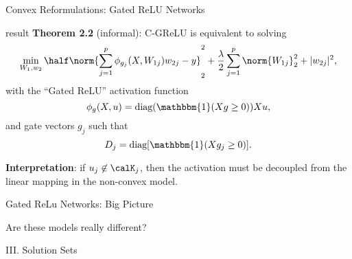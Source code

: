 \documentclass[usenames,dvipsnames,mathserif,notheorems]{beamer}
\begin{document}
\begin{frame}{Convex Reformulations: Gated ReLU Networks}

	\begin{beamercolorbox}[wd=\textwidth,sep=1em]{result}
		\textbf{Theorem 2.2} (informal): C-GReLU is equivalent to solving
		\[
			\min_{W_1, w_2} \half \norm{\sum_{j=1}^p \phi_{g_j}(X, W_{1j})w_{2j} - y}_2^2 + \frac{\lambda}{2} \sum_{j=1}^p \norm{W_{1j}}_2^2 + |w_{2j}|^2,
		\]
		with the ``Gated ReLU'' \citep{fiat2019decoupling} activation function
		\[ \phi_{g}(X, u) = \text{diag}(\mathbbm{1}(Xg \geq 0)) X u, \]
		and gate vectors \( g_j \) such that
		\[
			D_j = \text{diag}[\mathbbm{1}(X g_j \geq 0)].
		\]
	\end{beamercolorbox}
	\pause

	\textbf{Interpretation}: if \( u_j \not \in \calK_j \), then the activation
	must be decoupled from the linear mapping in the non-convex model.

\end{frame}



\begin{frame}{Gated ReLu Networks: Big Picture}
	\begin{center}
		\Large Are these models really different?
	\end{center}

	\pause

	\begin{figure}[]
		\centering
		
	\end{figure}
\end{frame}


\begin{frame}{}
	\begin{center}
		\huge III. Solution Sets
	\end{center}
\end{frame}
\end{document}
